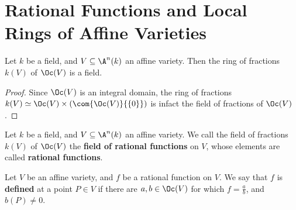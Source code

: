\section{Rational Functions and Local Rings of Affine Varieties}
\label{section_2.3}

\begin{lemma}\label{lemma_2.3.1}
  Let $k$ be a field, and  $V \subseteq \A^n(k)$ an affine variety.
  Then the ring of fractions $k(V)$ of $\Oc(V)$ is a field.
\end{lemma}
\begin{proof}
  Since $\Oc(V)$ is an integral domain, the ring of fractions $k(V)
  \simeq \Oc(V) \times (\com{\Oc(V)}{\{0\}})$ is infact the field of
  fractions of $\Oc(V)$.
\end{proof}

\begin{definition}
  Let $k$ be a field, and  $V \subseteq \A^n(k)$ an affine variety. We
  call the field of fractions $k(V)$ of $\Oc(V)$ the \textbf{field of
  rational functions} on $V$, whose elements are called
  \textbf{rational functions}.
\end{definition}

\begin{definition}
  Let $V$ be an affine variety, and  $f$ be a rational function on
  $V$. We say that  $f$ is \textbf{defined} at a point $P \in V$ if
  there are $a, b \in \Oc(V)$ for which $f=\frac{a}{b}$, and $b(P)
  \neq 0$.
\end{definition}

